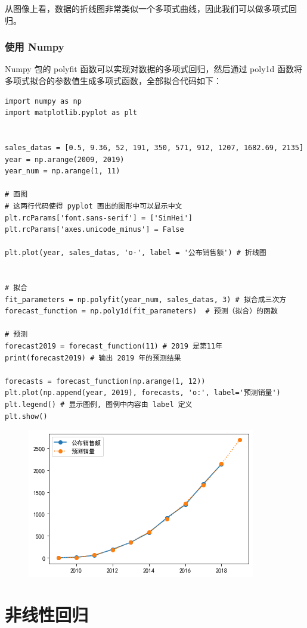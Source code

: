从图像上看，数据的折线图非常类似一个多项式曲线，因此我们可以做多项式回归。

\subsubsection{使用 Numpy}

Numpy 包的 polyfit 函数可以实现对数据的多项式回归，然后通过 poly1d 函数将多项式拟合的参数值生成多项式函数，全部拟合代码如下：

\begin{lstlisting}[Language=Python]
import numpy as np
import matplotlib.pyplot as plt


sales_datas = [0.5, 9.36, 52, 191, 350, 571, 912, 1207, 1682.69, 2135]
year = np.arange(2009, 2019)
year_num = np.arange(1, 11)

# 画图
# 这两行代码使得 pyplot 画出的图形中可以显示中文
plt.rcParams['font.sans-serif'] = ['SimHei']
plt.rcParams['axes.unicode_minus'] = False

plt.plot(year, sales_datas, 'o-', label = '公布销售额') # 折线图


# 拟合
fit_parameters = np.polyfit(year_num, sales_datas, 3) # 拟合成三次方
forecast_function = np.poly1d(fit_parameters)  # 预测（拟合）的函数

# 预测
forecast2019 = forecast_function(11) # 2019 是第11年
print(forecast2019) # 输出 2019 年的预测结果

forecasts = forecast_function(np.arange(1, 12))
plt.plot(np.append(year, 2019), forecasts, 'o:', label='预测销量')
plt.legend() # 显示图例, 图例中内容由 label 定义
plt.show()
\end{lstlisting}

\begin{figure}[ht]
  \centering
  \includegraphics[scale=0.8]{figure/polyRegression2.png}
\end{figure}

\section{非线性回归}

